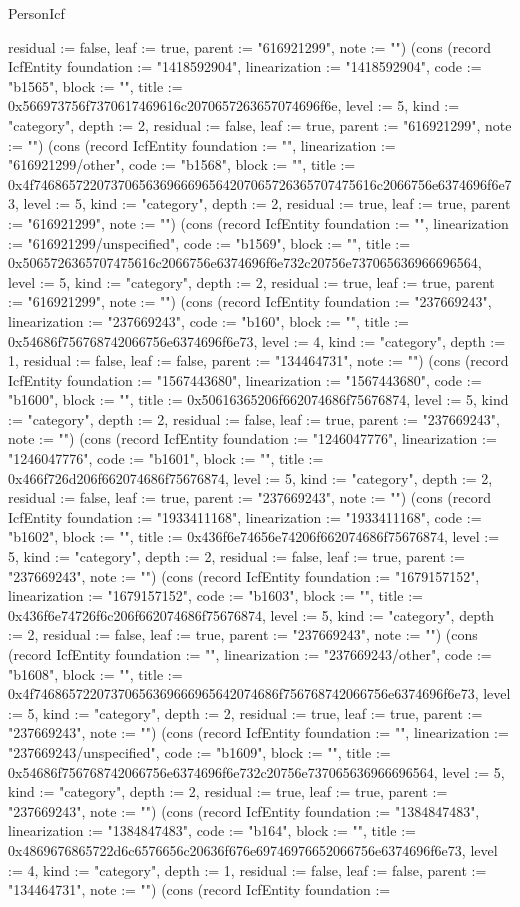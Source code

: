 \begin{lexlean}{PersonIcf}
\begin{semanticmodule}
{residual := false, leaf := true, parent := "616921299", note := ""}) (cons (record IcfEntity {foundation := "1418592904", linearization := "1418592904", code := "b1565", block := "", title := 0x566973756f7370617469616c2070657263657074696f6e, level := 5, kind := "category", depth := 2, residual := false, leaf := true, parent := "616921299", note := ""}) (cons (record IcfEntity {foundation := "", linearization := "616921299/other", code := "b1568", block := "", title := 0x4f7468657220737065636966696564207065726365707475616c2066756e6374696f6e73, level := 5, kind := "category", depth := 2, residual := true, leaf := true, parent := "616921299", note := ""}) (cons (record IcfEntity {foundation := "", linearization := "616921299/unspecified", code := "b1569", block := "", title := 0x5065726365707475616c2066756e6374696f6e732c20756e737065636966696564, level := 5, kind := "category", depth := 2, residual := true, leaf := true, parent := "616921299", note := ""}) (cons (record IcfEntity {foundation := "237669243", linearization := "237669243", code := "b160", block := "", title := 0x54686f756768742066756e6374696f6e73, level := 4, kind := "category", depth := 1, residual := false, leaf := false, parent := "134464731", note := ""}) (cons (record IcfEntity {foundation := "1567443680", linearization := "1567443680", code := "b1600", block := "", title := 0x50616365206f662074686f75676874, level := 5, kind := "category", depth := 2, residual := false, leaf := true, parent := "237669243", note := ""}) (cons (record IcfEntity {foundation := "1246047776", linearization := "1246047776", code := "b1601", block := "", title := 0x466f726d206f662074686f75676874, level := 5, kind := "category", depth := 2, residual := false, leaf := true, parent := "237669243", note := ""}) (cons (record IcfEntity {foundation := "1933411168", linearization := "1933411168", code := "b1602", block := "", title := 0x436f6e74656e74206f662074686f75676874, level := 5, kind := "category", depth := 2, residual := false, leaf := true, parent := "237669243", note := ""}) (cons (record IcfEntity {foundation := "1679157152", linearization := "1679157152", code := "b1603", block := "", title := 0x436f6e74726f6c206f662074686f75676874, level := 5, kind := "category", depth := 2, residual := false, leaf := true, parent := "237669243", note := ""}) (cons (record IcfEntity {foundation := "", linearization := "237669243/other", code := "b1608", block := "", title := 0x4f74686572207370656369666965642074686f756768742066756e6374696f6e73, level := 5, kind := "category", depth := 2, residual := true, leaf := true, parent := "237669243", note := ""}) (cons (record IcfEntity {foundation := "", linearization := "237669243/unspecified", code := "b1609", block := "", title := 0x54686f756768742066756e6374696f6e732c20756e737065636966696564, level := 5, kind := "category", depth := 2, residual := true, leaf := true, parent := "237669243", note := ""}) (cons (record IcfEntity {foundation := "1384847483", linearization := "1384847483", code := "b164", block := "", title := 0x4869676865722d6c6576656c20636f676e69746976652066756e6374696f6e73, level := 4, kind := "category", depth := 1, residual := false, leaf := false, parent := "134464731", note := ""}) (cons (record IcfEntity {foundation := }
\end{semanticmodule}
\end{lexlean}
